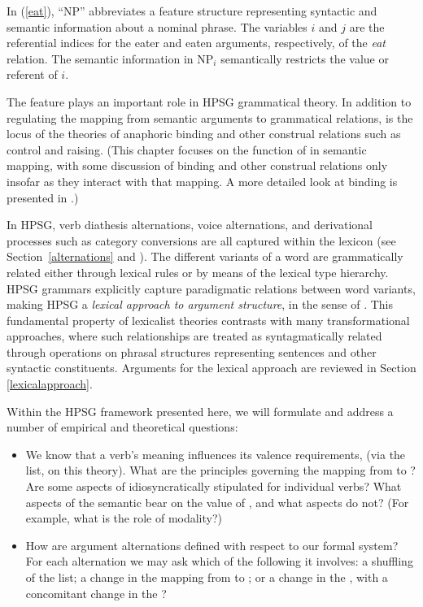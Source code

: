 \documentclass[output=paper
                ,modfonts
                ,nonflat
	        ,collection
	        ,collectionchapter
	        ,collectiontoclongg
 	        ,biblatex
                ,babelshorthands
                ,newtxmath
                ,draftmode
                ,colorlinks, citecolor=brown
]{./langsci/langscibook}
\begin{document}
	
\noindent
In (\ref{eat}), ``NP'' abbreviates a feature structure representing syntactic and semantic information about a nominal phrase.  The variables $i$ and 
$j$ are the referential indices for the eater and eaten arguments, respectively, of the \textit{eat} relation.  The semantic information in 
NP$_i$ semantically restricts the value or referent of $i$. 

The \argst feature plays an important  
role in HPSG grammatical theory.  In addition to regulating the mapping from semantic arguments to grammatical relations, \argst is the locus of the theories of anaphoric binding and other construal relations such as control and raising.  (This chapter focuses on the function of \argst  in semantic mapping, with some discussion of binding and other construal relations only insofar as they interact with that mapping.  A more detailed look at binding is presented in .)   

In HPSG, verb diathesis alternations, voice alternations, and derivational processes such as category conversions are all captured within the lexicon (see Section~\ref{alternations} and ).  The different variants of a word are grammatically related either through lexical rules or by means of the lexical type hierarchy.  HPSG grammars explicitly capture paradigmatic relations between word variants, making HPSG a \textit{lexical approach to argument structure}, in the sense of \citet{MWArgSt}.
This fundamental property of lexicalist theories contrasts with many transformational approaches, where such relationships are treated as syntagmatically related through operations on phrasal structures representing sentences and other syntactic constituents.  Arguments for the lexical approach are reviewed in Section \ref{lexicalapproach}.  

Within the HPSG framework presented here, we will formulate and address a number of empirical and theoretical questions: 

\begin{itemize}
\item We know that a verb's meaning influences its valence requirements, (via the \argst list, on this theory). 
 What are the principles governing the mapping from \content to \argst ?  Are some aspects of \argst idiosyncratically stipulated for individual verbs?  What aspects of the semantic \content  bear on the value of \argst, and what aspects do not?  (For example, what is the role of modality?)  
\item How are argument alternations defined with respect to our formal system?  For each alternation we may ask which of the following it involves: a shuffling of the \argst list;  a change in the mapping from \argst to \val; or  a change in the \content, with a concomitant change in the \argst?  
\end{itemize}
\end{document}
